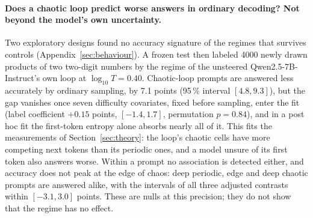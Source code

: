 \documentclass[11pt,letterpaper]{article}
\begin{document}
\paragraph{Does a chaotic loop predict worse answers in ordinary decoding? Not beyond the model's own uncertainty.}
Two exploratory designs found no accuracy signature of the regimes that survives controls
(Appendix~\ref{sec:behaviour}). A frozen test then labeled 4000 newly drawn products of two two-digit numbers by the regime
of the unsteered Qwen2.5-7B-Instruct's own loop at $\log_{10}T=0.40$. Chaotic-loop prompts are answered less
accurately by ordinary sampling, by 7.1 points (95\,\% interval $[4.8,9.3]$), but the gap vanishes once seven
difficulty covariates, fixed before sampling, enter the fit (label coefficient $+0.15$ points, $[-1.4,1.7]$,
permutation $p=0.84$), and in a post hoc fit the first-token entropy alone absorbs nearly all of it. This fits the measurements of
Section~\ref{sec:theory}: the loop's chaotic cells have more competing next tokens than its periodic ones, and a model
unsure of its first token also answers worse. Within a prompt no association is detected either, and accuracy does not peak at the edge of
chaos: deep periodic, edge and deep chaotic prompts are answered alike, with the intervals of all three adjusted contrasts within $[-3.1,3.0]$ points. These are nulls at this precision; they do not show that the regime has no effect.
\end{document}
